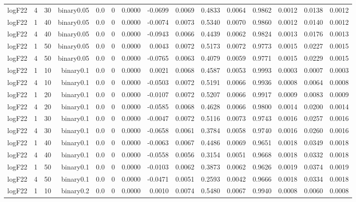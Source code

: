 \begin{longtable}{rrrrrrrrrrrrrrr}
  logF22 & 4 & 30 & binary0.05 & 0.0 & 0 & 0.0000 & -0.0699 & 0.0069 & 0.4833 & 0.0064 & 0.9862 & 0.0012 & 0.0138 & 0.0012 \\ 
  logF22 & 1 & 40 & binary0.05 & 0.0 & 0 & 0.0000 & -0.0074 & 0.0073 & 0.5340 & 0.0070 & 0.9860 & 0.0012 & 0.0140 & 0.0012 \\ 
  logF22 & 4 & 40 & binary0.05 & 0.0 & 0 & 0.0000 & -0.0943 & 0.0066 & 0.4439 & 0.0062 & 0.9824 & 0.0013 & 0.0176 & 0.0013 \\ 
  logF22 & 1 & 50 & binary0.05 & 0.0 & 0 & 0.0000 & 0.0043 & 0.0072 & 0.5173 & 0.0072 & 0.9773 & 0.0015 & 0.0227 & 0.0015 \\ 
  logF22 & 4 & 50 & binary0.05 & 0.0 & 0 & 0.0000 & -0.0765 & 0.0063 & 0.4079 & 0.0059 & 0.9771 & 0.0015 & 0.0229 & 0.0015 \\ 
  logF22 & 1 & 10 & binary0.1 & 0.0 & 0 & 0.0000 & 0.0021 & 0.0068 & 0.4587 & 0.0053 & 0.9993 & 0.0003 & 0.0007 & 0.0003 \\ 
  logF22 & 4 & 10 & binary0.1 & 0.0 & 0 & 0.0000 & -0.0503 & 0.0072 & 0.5191 & 0.0066 & 0.9936 & 0.0008 & 0.0064 & 0.0008 \\ 
  logF22 & 1 & 20 & binary0.1 & 0.0 & 0 & 0.0000 & -0.0107 & 0.0072 & 0.5207 & 0.0066 & 0.9917 & 0.0009 & 0.0083 & 0.0009 \\ 
  logF22 & 4 & 20 & binary0.1 & 0.0 & 0 & 0.0000 & -0.0585 & 0.0068 & 0.4628 & 0.0066 & 0.9800 & 0.0014 & 0.0200 & 0.0014 \\ 
  logF22 & 1 & 30 & binary0.1 & 0.0 & 0 & 0.0000 & -0.0047 & 0.0072 & 0.5116 & 0.0073 & 0.9743 & 0.0016 & 0.0257 & 0.0016 \\ 
  logF22 & 4 & 30 & binary0.1 & 0.0 & 0 & 0.0000 & -0.0658 & 0.0061 & 0.3784 & 0.0058 & 0.9740 & 0.0016 & 0.0260 & 0.0016 \\ 
  logF22 & 1 & 40 & binary0.1 & 0.0 & 0 & 0.0000 & -0.0063 & 0.0067 & 0.4486 & 0.0069 & 0.9651 & 0.0018 & 0.0349 & 0.0018 \\ 
  logF22 & 4 & 40 & binary0.1 & 0.0 & 0 & 0.0000 & -0.0558 & 0.0056 & 0.3154 & 0.0051 & 0.9668 & 0.0018 & 0.0332 & 0.0018 \\ 
  logF22 & 1 & 50 & binary0.1 & 0.0 & 0 & 0.0000 & -0.0103 & 0.0062 & 0.3873 & 0.0062 & 0.9626 & 0.0019 & 0.0374 & 0.0019 \\ 
  logF22 & 4 & 50 & binary0.1 & 0.0 & 0 & 0.0000 & -0.0471 & 0.0051 & 0.2593 & 0.0042 & 0.9666 & 0.0018 & 0.0334 & 0.0018 \\ 
  logF22 & 1 & 10 & binary0.2 & 0.0 & 0 & 0.0000 & 0.0010 & 0.0074 & 0.5480 & 0.0067 & 0.9940 & 0.0008 & 0.0060 & 0.0008 \\ 

\end{longtable}
